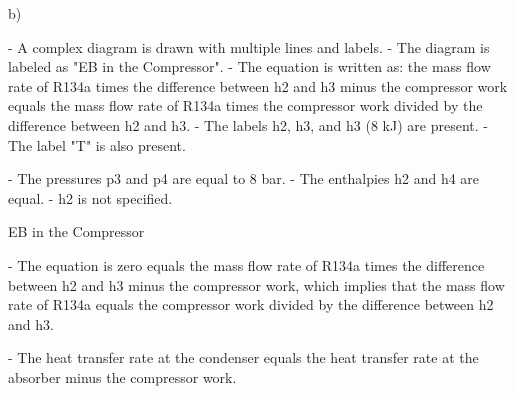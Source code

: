 b)

- A complex diagram is drawn with multiple lines and labels.
- The diagram is labeled as "EB in the Compressor".
- The equation is written as: the mass flow rate of R134a times the difference between h2 and h3 minus the compressor work equals the mass flow rate of R134a times the compressor work divided by the difference between h2 and h3.
- The labels h2, h3, and h3 (8 kJ) are present.
- The label "T" is also present.

- The pressures p3 and p4 are equal to 8 bar.
- The enthalpies h2 and h4 are equal.
- h2 is not specified.

EB in the Compressor

- The equation is zero equals the mass flow rate of R134a times the difference between h2 and h3 minus the compressor work, which implies that the mass flow rate of R134a equals the compressor work divided by the difference between h2 and h3.

- The heat transfer rate at the condenser equals the heat transfer rate at the absorber minus the compressor work.